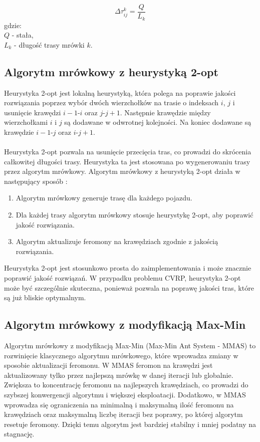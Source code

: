 \documentclass{article}
\begin{document}
\begin{equation}
    \Delta\tau_{ij}^k = \frac{Q}{L_k}
\end{equation}
gdzie:
\\
$Q$ - stała,
\\
$L_k$ - długość trasy mrówki $k$.


\subsection{Algorytm mrówkowy z heurystyką 2-opt}
Heurystyka 2-opt jest lokalną heurystyką, która polega na poprawie jakości rozwiązania poprzez wybór dwóch wierzchołków na trasie o indeksach $i$, $j$ i usunięcie krawędzi $i - 1$-$i$ oraz $j$-$j+1$. Następnie krawędzie między wierzchołkami $i$ i $j$ są dodawane w odwrotnej kolejności. Na koniec dodawane są krawędzie $i-1$-$j$ oraz $i$-$j+1$.
\\ \\
Heurystyka 2-opt pozwala na usunięcie przecięcia tras, co prowadzi do skrócenia całkowitej długości trasy. Heurystyka ta jest stosowana po wygenerowaniu trasy przez algorytm mrówkowy. Algorytm mrówkowy z heurystyką 2-opt działa w następujący sposób \cite{tan}:
\begin{enumerate}
    \item Algorytm mrówkowy generuje trasę dla każdego pojazdu.
    \item Dla każdej trasy algorytm mrówkowy stosuje heurystykę 2-opt, aby poprawić jakość rozwiązania.
    \item Algorytm aktualizuje feromony na krawędziach zgodnie z jakością rozwiązania.
\end{enumerate}
Heurystyka 2-opt jest stosunkowo prosta do zaimplementowania i może znacznie poprawić jakość rozwiązań. W przypadku problemu CVRP, heurystyka 2-opt może być szczególnie skuteczna, ponieważ pozwala na poprawę jakości tras, które są już bliskie optymalnym.

\subsection{Algorytm mrówkowy z modyfikacją Max-Min}

Algorytm mrówkowy z modyfikacją Max-Min (Max-Min Ant System - MMAS) \cite{maxmin} to rozwinięcie klasycznego algorytmu mrówkowego, które wprowadza zmiany w sposobie aktualizacji feromonu. W MMAS feromon na krawędzi jest aktualizowany tylko przez najlepszą mrówkę w danej iteracji lub globalnie. Zwiększa to koncentrację feromonu na najlepszych krawędziach, co prowadzi do szybszej konwergencji algorytmu i większej eksploatacji. Dodatkowo, w MMAS wprowadza się ograniczenia na minimalną i maksymalną ilość feromonu na krawędziach oraz maksymalną liczbę iteracji bez poprawy, po której algorytm resetuje feromony. Dzięki temu algorytm jest bardziej stabilny i mniej podatny na stagnację. 
\end{document}
